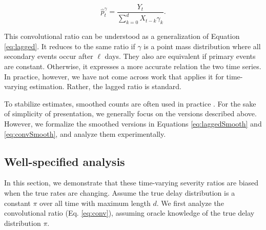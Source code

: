 \documentclass{article}
\begin{document}
\begin{equation}\label{eq:conv}
    \hat{p}_t^{\gamma} = \frac{Y_t}{\sum_{k=0}^d X_{t-k}\gamma_k}.%
\end{equation}

\noindent This convolutional ratio can be understood as a generalization of Equation \ref{eq:lagged}. It reduces to the same ratio if ${\gamma}$ is a point mass distribution where all secondary events occur after $\ell$ days. They also are equivalent if primary events are constant. Otherwise, it expresses a more accurate relation the two time series. In practice, however, we have not come across work that applies it for time-varying estimation. Rather, the lagged ratio is standard.


To stabilize estimates, smoothed counts are often used in practice \citep{germany,timevar_ifr,LIU2023100350}. For the sake of simplicity of presentation, we generally focus on the versions described above. However, we formalize the smoothed versions in Equations \ref{eq:laggedSmooth} and \ref{eq:convSmooth}, and analyze them experimentally.


\subsection{Well-specified analysis}\label{sec:analysis}

In this section, we demonstrate that these time-varying severity ratios are biased when the true rates are changing. Assume the true delay distribution is a constant $\pi$ over all time with maximum length $d$. We first analyze the convolutional ratio (Eq. \ref{eq:conv}), assuming oracle knowledge of the true delay distribution $\pi$.
\end{document}
